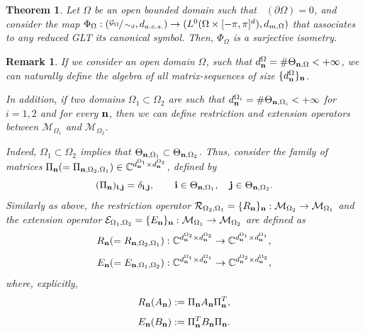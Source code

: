 \documentclass[10pt,a4paper]{amsart}
\newtheorem{thm}{Theorem}
\newtheorem{rem}{Remark}
\DeclareMathOperator{\Ld}{\mathcal{L}^d}
\begin{document}
\begin{thm}\label{isometry_red_GLT}
 Let $\Omega$ be an open bounded domain such that $\Ld(\partial\Omega)=0$, and consider the map $\Phi_\Omega:(\sfrac{\mathcal{G}_\Omega}{\sim_d},d_{a.c.s.})\to(L^0(\Omega\times[-\pi,\pi]^d),d_{m,\Omega})$ that associates to any reduced GLT its canonical symbol. Then, $\Phi_\Omega$ is a surjective isometry.   
\end{thm}

\begin{rem}\label{rem_restr_btw_domains}
    If we consider an open domain $\Omega$, such that $d_\mathbf n^{\Omega}=\#\Theta_{\mathbf n,\Omega}<+\infty$, we can naturally define the algebra of all matrix-sequences of size $\{d_\mathbf n^{\Omega}\}_\mathbf n$.
    
    In addition, if two domains $\Omega_1\subset\Omega_2$ are such that $d_\mathbf n^{\Omega_i}=\#\Theta_{\mathbf n,\Omega_i}<+\infty$ for $i=1,2$ and for every $\mathbf n$, then we can define restriction and extension operators between $\mathcal{M}_{\Omega_1}$ and $\mathcal{M}_{\Omega_2}$. 
    
    Indeed, $\Omega_1\subset\Omega_2$ implies that $\Theta_{\mathbf n,\Omega_1}\subset\Theta_{\mathbf n,\Omega_2}$. Thus, consider the family of matrices $\Pi_{\mathbf n}(=\Pi_{\mathbf n,\Omega_2,\Omega_1})\in\mathbb{C}^{d_{\mathbf n}^{\Omega_1}\times d_{\mathbf n}^{\Omega_2}}$, defined by
\begin{equation*}
    (\Pi_{\mathbf n})_{\mathbf i,\mathbf j}=\delta_{\mathbf i,\mathbf j},\qquad\mathbf i\in\Theta_{\mathbf n,\Omega_1},\quad \mathbf j\in\Theta_{\mathbf n,\Omega_2}.
\end{equation*}
Similarly as above, the restriction operator $\mathcal{R}_{\Omega_2,\Omega_1}=\{R_{\mathbf n}\}_\mathbf n:\mathcal{M}_{\Omega_2}\to\mathcal{M}_{\Omega_1}$ and the extension operator $\mathcal{E}_{\Omega_1,\Omega_2}=\{E_{\mathbf n}\}_\mathbf n:\mathcal{M}_{\Omega_1}\to\mathcal{M}_{\Omega_2}$ are defined as 
\begin{equation*}
	R_{\mathbf n}(=R_{\mathbf n,\Omega_2,\Omega_1}):\mathbb{C}^{d_{\mathbf n}^{\Omega_2}\times d_{\mathbf n}^{\Omega_2}}\to\mathbb{C}^{d_{\mathbf n}^{\Omega_1}\times d_{\mathbf n}^{\Omega_1}},
\end{equation*}
\begin{equation*}
	E_{\mathbf n}(=E_{\mathbf n,\Omega_1,\Omega_2}):\mathbb{C}^{d_{\mathbf n}^{\Omega_1}\times d_{\mathbf n}^{\Omega_1}}\to\mathbb{C}^{d_{\mathbf n}^{\Omega_2}\times d_{\mathbf n}^{\Omega_2}},
\end{equation*}
where, explicitly,
\begin{equation*}
	R_{\mathbf n}(A_{\mathbf n}):=\Pi_{\mathbf n}A_{\mathbf n}\Pi_{\mathbf n}^T,
\end{equation*}
\begin{equation*}
	E_{\mathbf n}(B_{\mathbf n}):=\Pi_{\mathbf n}^T B_{\mathbf n}\Pi_{\mathbf n}. 
\end{equation*}


\end{rem}
\end{document}
